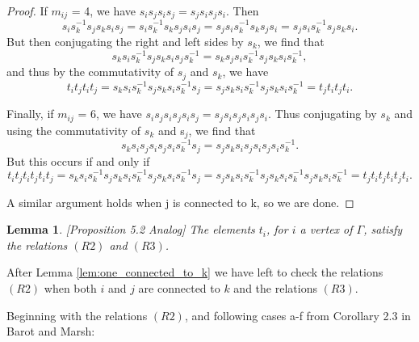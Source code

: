 \documentclass[11pt]{amsart}
\newtheorem{lem}[thm]{Lemma}
\theoremstyle{definition}
\begin{document}
\begin{proof}
If $m_{ij}$ = 4, we have $s_{i}s_{j}s_{i}s_{j} = s_{j}s_{i}s_{j}s_{i}$. Then $$s_{i}s_{k}^{-1}s_{j}s_{k}s_{i}s_{j} = s_{i}s_{k}^{-1}s_{k}s_{j}s_{i}s_{j} = s_{j}s_{i}s_{k}^{-1}s_{k}s_{j}s_{i} = s_{j}s_{i}s_{k}^{-1}s_{j}s_{k}s_{i}.$$ But then conjugating the right and left sides by $s_{k}$, we find that $$s_{k}s_{i}s_{k}^{-1}s_{j}s_{k}s_{i}s_{j}s_{k}^{-1} = s_{k}s_{j}s_{i}s_{k}^{-1}s_{j}s_{k}s_{i}s_{k}^{-1},$$ and thus by the commutativity of $s_{j}$ and $s_{k}$, we have $$t_{i}t_{j}t_{i}t_{j} = s_{k}s_{i}s_{k}^{-1}s_{j}s_{k}s_{i}s_{k}^{-1}s_{j} = s_{j}s_{k}s_{i}s_{k}^{-1}s_{j}s_{k}s_{i}s_{k}^{-1} = t_{j}t_{i}t_{j}t_{i}.$$

Finally, if $m_{ij}$ = 6, we have $s_{i}s_{j}s_{i}s_{j}s_{i}s_{j} = s_{j}s_{i}s_{j}s_{i}s_{j}s_{i}$. Thus conjugating by $s_{k}$ and using the commutativity of  $s_{k}$ and s$_{j}$, we find that $$s_{k}s_{i}s_{j}s_{i}s_{j}s_{i}s_{k}^{-1}s_{j} = s_{j}s_{k}s_{i}s_{j}s_{i}s_{j}s_{i}s_{k}^{-1}.$$ But this occurs if and only if $$t_{i}t_{j}t_{i}t_{j}t_{i}t_{j} = s_{k}s_{i}s_{k}^{-1}s_{j}s_{k}s_{i}s_{k}^{-1}s_{j}s_{k}s_{i}s_{k}^{-1}s_{j} = s_{j}s_{k}s_{i}s_{k}^{-1}s_{j}s_{k}s_{i}s_{k}^{-1}s_{j}s_{k}s_{i}s_{k}^{-1} = t_{j}t_{i}t_{j}t_{i}t_{j}t_{i}.$$ 

A similar argument holds when j is connected to k, so we are done.
\end{proof} 


\begin{lem}
\label{5.2 analog}
[Proposition 5.2 Analog] The elements $t_i$, for $i$ a vertex of $\Gamma$, satisfy the relations $(R2)$ and $(R3)$.
\end{lem}

After Lemma \ref{lem:one_connected_to_k} we have left to check the relations $(R2)$ when both $i$ and $j$ are connected to $k$ and the relations $(R3)$.


Beginning with the relations $(R2)$, and following cases a-f from Corollary 2.3 in Barot and Marsh:
\end{document}
